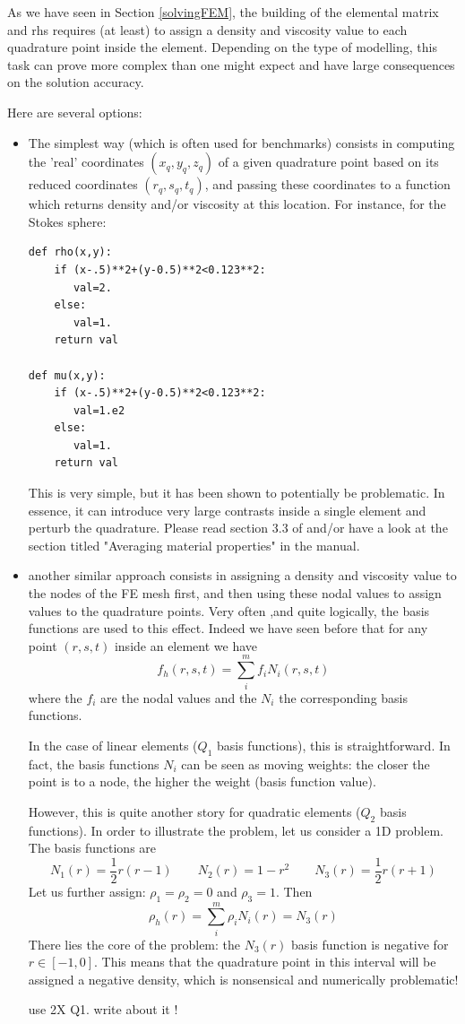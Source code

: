 
As we have seen in Section \ref{solvingFEM}, the building of the elemental matrix and rhs
requires (at least) to assign a density and viscosity value to each quadrature point inside
the element. Depending on the type of modelling, this task can prove more complex than 
one might expect and have large consequences on the solution accuracy.

Here are several options:

\begin{itemize}
\item The simplest way (which is often used for benchmarks) consists in computing the 'real'
coordinates $(x_q,y_q,z_q)$ of a given quadrature point based on its reduced coordinates 
$(r_q,s_q,t_q)$, and passing these coordinates to a function which returns density and/or viscosity
at this location. For instance, for the Stokes sphere:
\begin{verbatim}
def rho(x,y):
    if (x-.5)**2+(y-0.5)**2<0.123**2:
       val=2.
    else:
       val=1.
    return val

def mu(x,y):
    if (x-.5)**2+(y-0.5)**2<0.123**2:
       val=1.e2
    else:
       val=1.
    return val
\end{verbatim}
This is very simple, but it has been shown to potentially be problematic. In essence, it can introduce very large contrasts inside a single element and perturb the quadrature. Please read section 3.3 of \cite{hedg17} and/or
have a look at the section titled "Averaging material properties" in the \aspect{} manual.

\item another similar approach consists in assigning a density and viscosity value to the nodes of the FE mesh first, and then using these nodal values to assign values to the quadrature points. Very often ,and quite logically, the basis functions are used to this effect. Indeed we have seen before that for any point $(r,s,t)$ inside an element we have
\[
f_h(r,s,t) = \sum_{i}^m f_i N_i(r,s,t)
\]  
where the $f_i$ are the nodal values and the $N_i$ the corresponding basis functions. 

In the case of linear elements ($Q_1$ basis functions), this is straightforward. In fact, the basis functions $N_i$ can be seen as moving weights: the closer the point is to a node, the higher the weight (basis function value). 

However, this is quite another story for quadratic elements ($Q_2$ basis functions). In order to illustrate the 
problem, let us consider a 1D problem. The basis functions are 
\[
N_1(r) =\frac{1}{2}r(r-1)
\quad\quad
N_2(r)=1-r^2
\quad\quad
N_3(r) =\frac{1}{2}r(r+1)
\]
Let us further assign: $\rho_1=\rho_2=0$ and $\rho_3=1$. Then 
\[
\rho_h(r) = \sum_{i}^m \rho_i N_i(r) = N_3(r)
\]  
There lies the core of the problem: the $N_3(r)$ basis function is negative for $r\in[-1,0]$. This means that the quadrature point in this interval will be assigned a negative density, which is nonsensical and numerically problematic!

{\color{red} use 2X Q1. write about it !}

\end{itemize}

